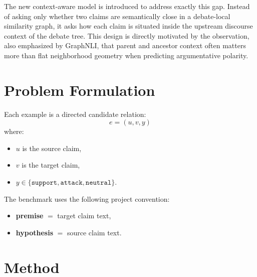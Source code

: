 \documentclass[11pt,a4paper]{article}
\begin{document}
The new context-aware model is introduced to address exactly this gap. Instead of asking only whether two claims are semantically close in a debate-local similarity graph, it asks how each claim is situated inside the upstream discourse context of the debate tree. This design is directly motivated by the observation, also emphasized by GraphNLI, that parent and ancestor context often matters more than flat neighborhood geometry when predicting argumentative polarity.

\section{Problem Formulation}
Each example is a directed candidate relation:
\begin{equation}
e = (u, v, y)
\end{equation}
where:
\begin{itemize}[leftmargin=1.5em]
  \item \(u\) is the source claim,
  \item \(v\) is the target claim,
  \item \(y \in \{\texttt{support}, \texttt{attack}, \texttt{neutral}\}\).
\end{itemize}

The benchmark uses the following project convention:
\begin{itemize}[leftmargin=1.5em]
  \item \textbf{premise} \(=\) target claim text,
  \item \textbf{hypothesis} \(=\) source claim text.
\end{itemize}

\section{Method}
\end{document}
